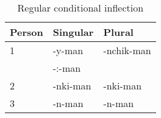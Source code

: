 \begin{table}[!ht]
\caption{Regular conditional inflection}\label{Tab21a}
\begin{small}
\begin{center}
\begin{tabular}{lll}
\toprule
Person		& Singular		& Plural	\\
\midrule
1	& -y-man\tss{\AMV,\LT}		& -nchik-man		\\
	& -:-man\tss{\ACH,\CH,\SP}	& 		\\[2ex]
2	& -nki-man		& -nki-man		\\[2ex]
3	& -n-man		& -n-man		\\
\bottomrule
\end{tabular}
\end{center}
\end{small}
\end{table}

\begin{table}[!ht]
\caption{Regular conditional inflection -- actor-object suffixes}\label{Tab21b}
\begin{small}
\begin{center}
\end{center}
\end{small}
\end{table}

